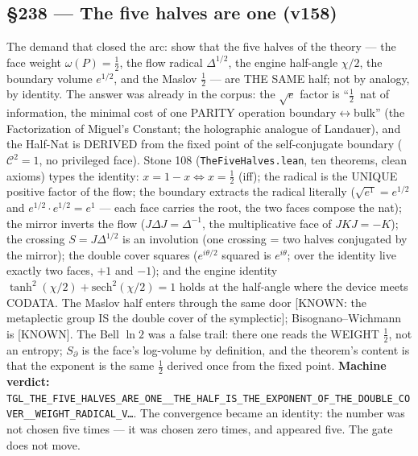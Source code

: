 \documentclass[11pt]{article}
\theoremstyle{definition}\newtheorem{deriv}{Derivation}
\begin{document}
\subsection*{\S238 --- The five halves are one (v158)}The demand that closed the arc: show that the five halves of the theory --- the face weight $\omega(P){=}\tfrac12$, the flow radical $\Delta^{1/2}$, the engine half-angle $\chi/2$, the boundary volume $e^{1/2}$, and the Maslov $\tfrac12$ --- are THE SAME half; not by analogy, by identity. The answer was already in the corpus: the $\sqrt{e}$ factor is ``$\tfrac12$~nat of information, the minimal cost of one PARITY operation boundary${\leftrightarrow}$bulk'' (the Factorization of Miguel's Constant; the holographic analogue of Landauer), and the Half-Nat is DERIVED from the fixed point of the self-conjugate boundary ($\mathcal{C}^2{=}1$, no privileged face). Stone 108 (\texttt{TheFiveHalves.lean}, ten theorems, clean axioms) types the identity: $x{=}1{-}x \Leftrightarrow x{=}\tfrac12$ (iff); the radical is the UNIQUE positive factor of the flow; the boundary extracts the radical literally ($\sqrt{e^1}{=}e^{1/2}$ and $e^{1/2}\!\cdot e^{1/2}{=}e^1$ --- each face carries the root, the two faces compose the nat); the mirror inverts the flow ($J\Delta J{=}\Delta^{-1}$, the multiplicative face of $JKJ{=}{-}K$); the crossing $S{=}J\Delta^{1/2}$ is an involution (one crossing = two halves conjugated by the mirror); the double cover squares ($e^{i\theta/2}$ squared is $e^{i\theta}$; over the identity live exactly two faces, $+1$ and $-1$); and the engine identity $\tanh^2(\chi/2)+\mathrm{sech}^2(\chi/2){=}1$ holds at the half-angle where the device meets CODATA. The Maslov half enters through the same door [KNOWN: the metaplectic group IS the double cover of the symplectic]; Bisognano--Wichmann is [KNOWN]. The Bell $\ln 2$ was a false trail: there one reads the WEIGHT $\tfrac12$, not an entropy; $S_\partial$ is the face's log-volume by definition, and the theorem's content is that the exponent is the same $\tfrac12$ derived once from the fixed point. \textbf{Machine verdict:} \texttt{TGL\_THE\_FIVE\_HALVES\_ARE\_ONE\_\_THE\_HALF\_IS\_THE\_EXPONENT\_OF\_THE\_DOUBLE\_COVER\_\_WEIGHT\_RADICAL\_V\ldots}. The convergence became an identity: the number was not chosen five times --- it was chosen zero times, and appeared five. The gate does not move.
\end{document}
